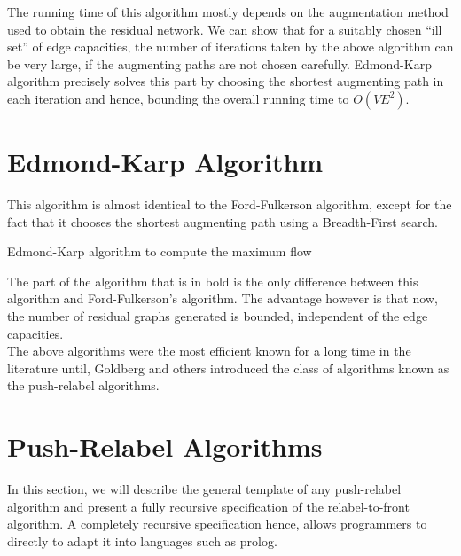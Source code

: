 \documentclass[BTech]{iitmdiss}
\begin{document}
	    The running time of this algorithm mostly depends on the augmentation method used to obtain the residual network. We can show that 
	    for a suitably chosen ``ill set'' of edge capacities, the number of iterations taken by the above algorithm can be very large, if the augmenting
	    paths are not chosen carefully. Edmond-Karp algorithm precisely solves this part by choosing the shortest augmenting path in each iteration
	    and hence, bounding the overall running time to $O(V E^2)$.
	  
	  \section{Edmond-Karp Algorithm}
	    This algorithm is almost identical to the Ford-Fulkerson algorithm, except for the fact that it chooses the shortest augmenting path using 
	    a Breadth-First search.
	    
	    \begin{algorithm}[H]
	      
	      
		
	      \caption{Edmond-Karp algorithm to compute the maximum flow}
	    \end{algorithm}
	    	  
	    The part of the algorithm that is in bold is the only difference between this algorithm and Ford-Fulkerson's algorithm. The advantage 
	    however is that now, the number of residual graphs generated is bounded, independent of the edge capacities. \\
	    
	    The above algorithms were the most efficient known for a long time in the literature until, Goldberg and others introduced the 
	    class of algorithms known as the push-relabel algorithms. \\
	    
	   \section{Push-Relabel Algorithms}
	      In this section, we will describe the general template of any push-relabel algorithm and present a fully recursive specification
	      of the relabel-to-front algorithm. A completely recursive specification hence, allows programmers to directly to adapt it into languages
	      such as prolog. \\
	      
\end{document}
